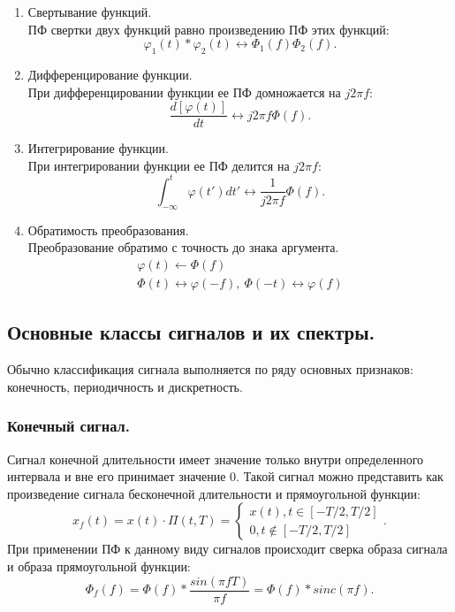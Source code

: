 \documentclass[a4paper,14pt]{extarticle}
\begin{document}
\begin{enumerate}
\item Свертывание функций. \\ ПФ свертки двух функций равно произведению ПФ этих функций:
\begin{equation*}
\varphi_1(t) * \varphi_2(t) \leftrightarrow  \Phi_1(f)  \Phi_2(f).
\end{equation*}

\item Дифференцирование функции. \\ При дифференцировании функции ее ПФ домножается на $j 2 \pi f$:
\begin{equation*}
\frac{d[\varphi(t)]}{dt} \leftrightarrow j 2 \pi f \Phi (f).
\end{equation*}

\item Интегрирование функции. \\ При интегрировании функции ее ПФ делится на $j 2 \pi f$:
\begin{equation*}
\int_{-\infty}^{t} \varphi(t') dt' \leftrightarrow \frac{1}{j 2 \pi f} \Phi (f).
\end{equation*}

\item Обратимость преобразования. \\ Преобразование обратимо с точность до знака аргумента. 
\begin{gather*}
\varphi(t) \leftarrow \Phi (f) \\ \Phi(t) \leftrightarrow \varphi (-f), ~ \Phi(-t) \leftrightarrow \varphi(f)
\end{gather*}

\end{enumerate}  


\subsection{Основные классы сигналов и их спектры.}

Обычно классификация сигнала выполняется по ряду основных признаков: конечность, периодичность и дискретность.

\subsubsection{Конечный сигнал.}

Сигнал конечной длительности имеет значение только внутри определенного интервала и вне его принимает значение 0. Такой сигнал можно представить как произведение сигнала бесконечной длительности и прямоугольной функции:
\begin{equation*}
x_f (t) = x(t) \cdot \Pi(t, T) = \begin{cases} x(t), t \in [-T/2, T/2] \\ 0, t \notin  [-T/2, T/2] \end{cases}.
\end{equation*}
При применении ПФ к данному виду сигналов происходит сверка образа сигнала и образа прямоугольной функции:
\begin{equation*}
\Phi_f(f) = \Phi(f) * \frac{sin(\pi f T)}{\pi f} = \Phi(f) * sinc(\pi f).
\end{equation*}
\end{document}

